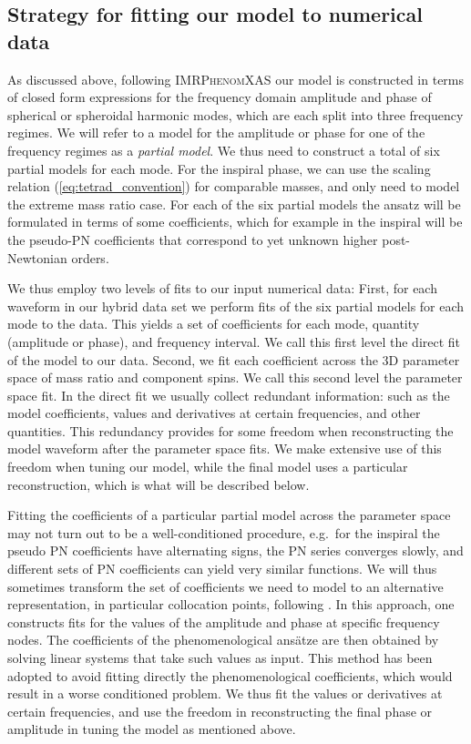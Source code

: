 \documentclass[twocolumn,prd,aps,superscriptaddress,preprintnumbers,tightenlines,showpacs,nofootinbib,eqsecnum,amsfonts,amsmath]{revtex4}
\newcommand{\phX}{\textsc{IMRPhenomXAS}\xspace}
\begin{document}
\subsection{Strategy for fitting our model to numerical data} \label{sec:fitting_plan}

As discussed above, following \phX our model is constructed in terms of closed form expressions for the frequency domain amplitude and phase of spherical or spheroidal harmonic modes, which are each split into three frequency regimes.
We will refer to a model for the amplitude or phase for one of the frequency regimes as a {\em partial model}.
We thus need to construct a total of six partial models for each mode. For the inspiral phase, we can use the scaling relation (\ref{eq:tetrad_convention}) for comparable masses, and only need to model the extreme mass ratio case.
For each of the six partial models the ansatz will be formulated in terms of some coefficients, which for example in the inspiral will be the pseudo-PN coefficients that correspond to yet unknown higher post-Newtonian orders.

We thus employ two levels of fits to our input numerical data:
First, for each waveform in our hybrid data set we perform fits of the six partial models for each mode to the data. This yields a set of coefficients for each mode, quantity (amplitude or phase), and frequency interval. We call this first level the direct fit of the model to our data.
Second, we fit each coefficient across the 3D parameter space of mass ratio and component spins. We call this second level the parameter space fit.
In the direct fit we usually collect redundant information: such as the model coefficients, values and derivatives at certain frequencies, and other quantities.
This redundancy provides for some freedom when
reconstructing the model waveform after the parameter space fits. We make extensive use of this freedom when tuning our model, while the final model uses a particular reconstruction, which is what will be described below.

Fitting the coefficients of a particular partial model across the parameter space may not turn out to be a well-conditioned procedure, e.g.~for the inspiral the pseudo PN coefficients have alternating signs, the PN series converges slowly, and different sets of PN coefficients
can yield very similar functions. We will thus sometimes transform the set of coefficients we need to model to an alternative representation, in particular collocation points, following
\cite{Husa:2015iqa,Khan:2015jqa,phenX}. In this approach, one constructs fits for the values of the amplitude and phase at specific frequency nodes. The coefficients of the phenomenological ansätze are then obtained by solving linear systems that take such values as input. This method has been adopted to avoid fitting directly the phenomenological coefficients, which would result in a worse conditioned problem. We thus fit the values or derivatives at certain frequencies, and use the freedom in reconstructing the final phase or amplitude in tuning the model as mentioned above.
\end{document}
